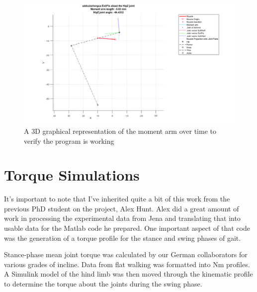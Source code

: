 \documentclass[runningheads,a4paper]{llncs}
\begin{document}
		\begin{figure}
			\centering
			\includegraphics[width=.7\textwidth]{mom2.png}
			\caption{A 3D graphical representation of the moment arm over time to verify the program is working}
			\label{fig:mom2}
		\end{figure}
		\FloatBarrier
	\section{Torque Simulations}
	It's important to note that I've inherited quite a bit of this work from the previous PhD student on the project, Alex Hunt. Alex did a great amount of work in processing the experimental data from Jena and translating that into usable data for the Matlab code he prepared. One important aspect of that code was the generation of a torque profile for the stance and swing phases of gait. \par
	Stance-phase mean joint torque was calculated by our German collaborators for various grades of incline. Data from flat walking was formatted into Nm profiles. A Simulink model of the hind limb was then moved through the kinematic profile to determine the torque about the joints during the swing phase.
\end{document}
